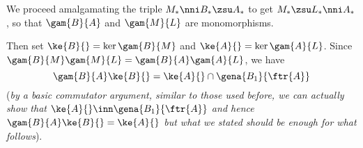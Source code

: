 \documentclass[a4paper,11pt,german,english]{article}
\begin{document}
\bigskip\noindent
We proceed amalgamating the triple $M_{*}\nni B_{*}\zsu A_{*}$ to get $M_{*}\zsu L_{*}\nni A_{*}$, so that
$\gam{B}{A}$ and $\gam{M}{L}$ are monomorphisms.

Then set $\ke{B}{}=\ker\gam{B}{M}$ and $\ke{A}{}=\ker\gam{A}{L}$. Since $\gam{B}{M}\gam{M}{L}=\gam{B}{A}\gam{A}{L}$, we have $$\gam{B}{A}\ke{B}{}=\ke{A}{}\cap\gena{B_{1}}{\ftr{A}}$$
({\em by a basic commutator argument, similar to those used before, we can actually show that $\ke{A}{}\inn\gena{B_{1}}{\ftr{A}}$ and hence
$\gam{B}{A}\ke{B}{}=\ke{A}{}$ but what we stated should be enough for what follows}).





\end{document}
